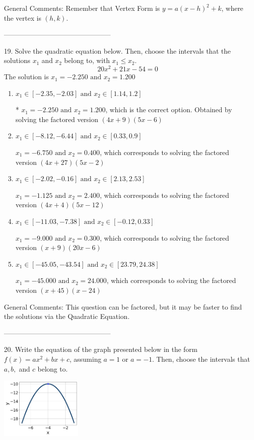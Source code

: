 \documentclass{extbook}[14pt]
\begin{document}
General Comments: Remember that Vertex Form is $y = a(x-h)^2+k$, where the vertex is $(h, k)$.

-----------------------------------------------

19. Solve the quadratic equation below. Then, choose the intervals that the solutions $x_1$ and $x_2$ belong to, with $x_1 \leq x_2$.
\[ 20x^{2} +21 x -54 = 0 \] 
The solution is $ x_1 = -2.250 \text{ and } x_2 = 1.200 $ 

\begin{enumerate}[label=\Alph*.] 
\item $ x_1 \in [-2.35, -2.03] \text{ and } x_2 \in [1.14, 1.2] $ 

 * $x_1 = -2.250 \text{ and } x_2 = 1.200$, which is the correct option. Obtained by solving the factored version $(4x + 9)(5x -6)$ 
\item $ x_1 \in [-8.12, -6.44] \text{ and } x_2 \in [0.33, 0.9] $ 

 $x_1 = -6.750 \text{ and } x_2 = 0.400$, which corresponds to solving the factored version $(4x + 27)(5x -2)$ 
\item $ x_1 \in [-2.02, -0.16] \text{ and } x_2 \in [2.13, 2.53] $ 

 $x_1 = -1.125 \text{ and } x_2 = 2.400$, which corresponds to solving the factored version $(4x + 4)(5x -12)$ 
\item $ x_1 \in [-11.03, -7.38] \text{ and } x_2 \in [-0.12, 0.33] $ 

 $x_1 = -9.000 \text{ and } x_2 = 0.300$, which corresponds to solving the factored version $(x + 9)(20x -6)$ 
\item $ x_1 \in [-45.05, -43.54] \text{ and } x_2 \in [23.79, 24.38] $ 

 $x_1 = -45.000 \text{ and } x_2 = 24.000$, which corresponds to solving the factored version $(x + 45)(x -24)$ 
\end{enumerate} 
 
General Comments: This question can be factored, but it may be faster to find the solutions via the Quadratic Equation.

-----------------------------------------------

20. Write the equation of the graph presented below in the form $f(x)=ax^2+bx+c$, assuming  $a=1$ or $a=-1$. Then, choose the intervals that $a, b,$ and $c$ belong to.
\begin{center} \includegraphics[width=0.3\textwidth]{../Figures/quadraticGraphToEquationC.png} \end{center} 
\end{document}
